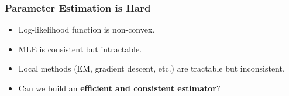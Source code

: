 \documentclass[xcolor={svgnames}]{beamer}
\begin{document}
\begin{frame}
  \frametitle{Parameter Estimation is Hard}



  \begin{itemize}
    \item<1-> Log-likelihood function is non-convex.
    \item<2-> MLE is consistent but intractable.
    \item<3-> Local methods (EM, gradient descent, etc.) are tractable but inconsistent.
    \item<4-> Can we build an {\bf efficient and consistent estimator}?
  \end{itemize}

\end{frame}
\end{document}
